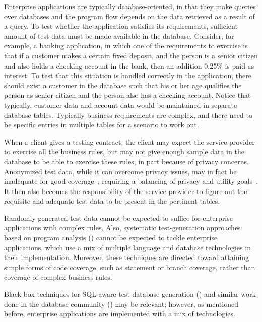 
Enterprise applications are typically database-oriented, in that they make
queries over databases and the program flow depends on the data retrieved as a
result of a query.  To test whether the application satisfies its requirements,
sufficient amount of test data must be made available in the database. Consider,
for example, a banking application, in which one of the requirements to exercise
is that if a customer makes a certain fixed deposit, and the person is a senior
citizen and also holds a checking account in the bank, then an addition 0.25\%
is paid as interest. To test that this situation is handled correctly in the
application, there should exist a customer in the database such that his or her
age qualifies the person as senior citizen and the person also has a checking
account. Notice that typically, customer data and account data would be
maintained in separate database tables. Typically business requirements are
complex, and there need to be specific entries in multiple tables for a scenario
to work out.

When a client gives a testing contract, the client may expect the service
provider to exercise all the business rules, but may not give enough sample data
in the database to be able to exercise these rules, in part because of privacy
concerns. Anonymized test data, while it can overcome privacy issues, may in
fact be inadequate for good coverage~\cite{Grechanik:2010}, requiring a
balancing of privacy and utility goals~\cite{Taneja:2011}.  It then also becomes
the responsibility of the service provider to figure out the requisite and
adequate test data to be present in the pertinent tables.

Randomly generated test data cannot be expected to suffice for enterprise
applications with complex rules. Also, systematic test-generation approaches
based on program analysis (\eg \cite{Emmi:2007,Li:2010,Marcozzi:2012,Pan:2011})
cannot be expected to tackle enterprise applications, which use a mix of
multiple language and database technologies in their implementation. Moreover,
these techniques are directed toward attaining simple forms of code coverage,
such as statement or branch coverage, rather than coverage of complex business
rules.

Black-box techniques for SQL-aware test database generation
(\eg \cite{Adir:2011, delaRiva:2010, Khalek:2008}) and similar work done in the
database community (\eg \cite{Arasu:2011, Binnig:2007b}) may be relevant;
however, as mentioned before, enterprise applications are implemented with a mix
of technologies.

